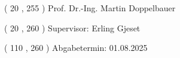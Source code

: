 \begin{textblock}{80}( 20 , 255 )
\large
\noindent
Prof. Dr.-Ing. Martin Doppelbauer							%
\end{textblock}

\begin{textblock}{80}( 20 , 260 )
\large
\flushleft
\noindent
Supervisor: Erling Gjeset                             %
\end{textblock}

\begin{textblock}{80}( 110 , 260 )
\flushright
\large
Abgabetermin: 01.08.2025                        %
\end{textblock}

\null\newpage

%




